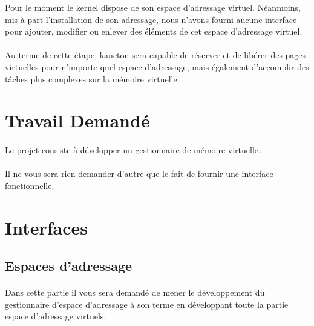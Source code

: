 \documentclass[10pt,a4wide]{article}
\begin{document}
Pour le moment le kernel dispose de son espace d'adressage virtuel.
N\'eanmoins, mis \`a part l'installation de son adressage, nous n'avons
fourni aucune interface pour ajouter, modifier ou enlever des \'el\'ements
de cet espace d'adressage virtuel.

\paragraph{}

Au terme de cette \'etape, kaneton sera capable de r\'eserver et
de lib\'erer des pages virtuelles pour n'importe quel espace d'adressage,
mais \'egalement d'accomplir des t\^aches plus complexes sur la
m\'emoire virtuelle.

\section{Travail Demand\'e}

\paragraph{}

Le projet consiste \`a d\'evelopper un gestionnaire de m\'emoire virtuelle.

\paragraph{}

Il ne vous sera rien demander d'autre que le fait de fournir une interface
fonctionnelle.

\section{Interfaces}

\subsection{Espaces d'adressage}

\paragraph{}

Dans cette partie il vous sera demand\'e de mener le d\'eveloppement du
gestionnaire d'espace d'adressage \`a son terme en d\'eveloppant toute la
partie espace d'adressage virtuels.

\paragraph{}
\end{document}
